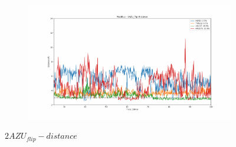 \documentclass[fleqn,10pt]{wlscirep}
\begin{document}
\begin{figure}[!ht]
\begin{subfigure}{.45\textwidth}
  \end{subfigure}
    \begin{subfigure}{.45\textwidth}
     \centering
     \includegraphics[width=.95\linewidth]{2AZU_flip/2AZU_flip-dist_3.pdf}
  \end{subfigure}
\caption{$2AZU_{flip}-distance$}
\label{sup:2AZU_flip-dist}
\end{figure}
\end{document}
